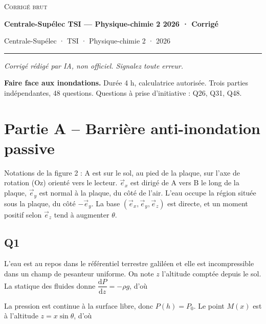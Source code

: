 \documentclass[11pt,a4paper]{article}
\newcommand{\equationajustee}[1]{%
  \sbox{\boiteequation}{$\displaystyle #1$}%
  \ifdim\wd\boiteequation>\linewidth
    \[\resizebox{\linewidth}{!}{\usebox{\boiteequation}}\]%
  \else
    \[#1\]%
  \fi}
\begin{document}
\thispagestyle{plain}
\begin{center}
  {\small\scshape Corrigé brut}\par\smallskip
  {\LARGE\bfseries Centrale-Supélec TSI — Physique-chimie 2 2026 · Corrigé\par}\medskip
  {\large Centrale-Supélec · TSI · Physique-chimie 2 · 2026\par}
\end{center}
\vspace{2pt}\hrule\vspace{8pt}

\emph{Corrigé rédigé par IA, non officiel. Signalez toute erreur.}

\textbf{Faire face aux inondations.} Durée 4 h, calculatrice autorisée. Trois parties indépendantes, 48 questions. Questions à prise d'initiative : Q26, Q31, Q48.

\hypertarget{partie-a-barriuxe8re-anti-inondation-passive}{%
\section{Partie A -- Barrière anti-inondation passive}\label{partie-a-barriuxe8re-anti-inondation-passive}}

Notations de la figure 2 : A est sur le sol, au pied de la plaque, sur l'axe de rotation (Oz) orienté vers le lecteur. \(\vec e_x\) est dirigé de A vers B le long de la plaque, \(\vec e_y\) est normal à la plaque, du côté de l'air. L'eau occupe la région située sous la plaque, du côté \(-\vec e_y\). La base \((\vec e_x,\vec e_y,\vec e_z)\) est directe, et un moment positif selon \(\vec e_z\) tend à augmenter \(\theta\).

\hypertarget{q1}{%
\subsection{Q1}\label{q1}}

L'eau est au repos dans le référentiel terrestre galiléen et elle est incompressible dans un champ de pesanteur uniforme. On note \(z\) l'altitude comptée depuis le sol. La statique des fluides donne \(\dfrac{\mathrm dP}{\mathrm dz}=-\rho g\), d'où

\equationajustee{P(z)=P(h)+\rho g(h-z).}

La pression est continue à la surface libre, donc \(P(h)=P_0\). Le point \(M(x)\) est à l'altitude \(z=x\sin\theta\), d'où

\equationajustee{\boxed{P_{\text{eau}}(M)=P_0+\rho g\,(h-x\sin\theta)}}
\end{document}
